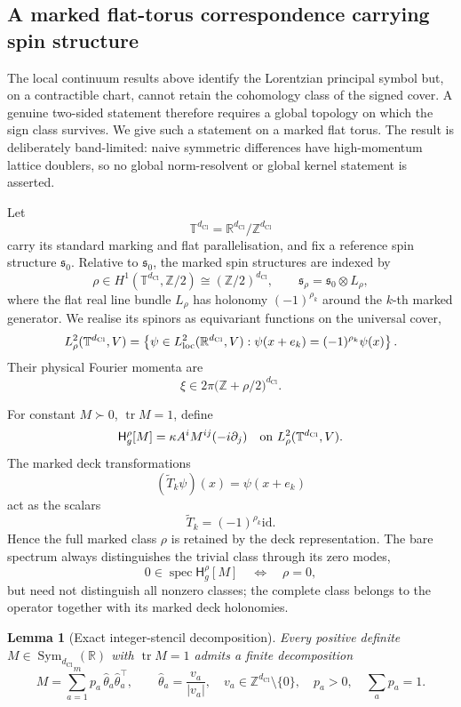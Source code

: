 \documentclass[11pt]{article}
\newtheorem{lemma}[theorem]{Lemma}
\theoremstyle{definition}
\theoremstyle{remark}
\newcommand{\Z}{\mathbb{Z}}
\newcommand{\R}{\mathbb{R}}
\newcommand{\Ztwo}{\mathbb{Z}/2}
\newcommand{\T}{\mathbb{T}}
\newcommand{\dCl}{d_{\mathrm{Cl}}}
\newcommand{\id}{\mathrm{id}}
\newcommand{\spec}{\operatorname{spec}}
\newcommand{\tr}{\operatorname{tr}}
\newcommand{\Ham}{\mathsf{H}}
\begin{document}
\subsection{A marked flat-torus correspondence carrying spin structure}
\label{subsec:marked-torus-correspondence}

The local continuum results above identify the Lorentzian principal symbol but,
on a contractible chart, cannot retain the cohomology class of the signed cover.
A genuine two-sided statement therefore requires a global topology on which the
sign class survives.  We give such a statement on a marked flat torus.  The
result is deliberately band-limited: naive symmetric differences have
high-momentum lattice doublers, so no global norm-resolvent or global kernel
statement is asserted.

Let
\[
  \T^{\dCl}=\R^{\dCl}/\Z^{\dCl}
\]
carry its standard marking and flat parallelisation, and fix a reference spin
structure \(\mathfrak s_0\).  Relative to \(\mathfrak s_0\), the marked spin
structures are indexed by
\[
  \rho\in H^1(\T^{\dCl},\Ztwo)\cong(\Ztwo)^{\dCl},
  \qquad
  \mathfrak s_\rho=\mathfrak s_0\otimes L_\rho ,
\]
where the flat real line bundle \(L_\rho\) has holonomy
\((-1)^{\rho_k}\) around the \(k\)-th marked generator.  We realise its spinors
as equivariant functions on the universal cover,
\[
  L^2_\rho(\T^{\dCl},V)
  =
  \left\{\psi\in L^2_{\rm loc}(\R^{\dCl},V):
  \psi(x+e_k)=(-1)^{\rho_k}\psi(x)\right\}.
\]
Their physical Fourier momenta are
\[
  \xi\in2\pi\bigl(\Z+\rho/2\bigr)^{\dCl}.
\]

For constant \(M\succ0\), \(\tr M=1\), define
\[
  \Ham^\rho_g[M]
  =
  \kappa A^iM^{ij}(-i\partial_j)
  \quad\hbox{on }L^2_\rho(\T^{\dCl},V).
\]
The marked deck transformations
\[
  (\widetilde T_k\psi)(x)=\psi(x+e_k)
\]
act as the scalars
\[
  \widetilde T_k=(-1)^{\rho_k}\id .
\]
Hence the full marked class \(\rho\) is retained by the deck representation.
The bare spectrum always distinguishes the trivial class through its zero modes,
\[
  0\in\spec\Ham^\rho_g[M]\quad\Longleftrightarrow\quad\rho=0,
\]
but need not distinguish all nonzero classes; the complete class belongs to the
operator together with its marked deck holonomies.

\begin{lemma}[Exact integer-stencil decomposition]
\label{lem:integer-stencil-decomposition}
Every positive definite \(M\in\operatorname{Sym}_{\dCl}(\R)\) with \(\tr M=1\) admits a finite
decomposition
\[
  M=\sum_{a=1}^{m}p_a\,\hat\theta_a\hat\theta_a^\top,
  \qquad
  \hat\theta_a=\frac{v_a}{|v_a|},
  \quad
  v_a\in\Z^{\dCl}\setminus\{0\},
  \quad
  p_a>0,\quad \sum_ap_a=1 .
\]
\end{lemma}
\end{document}
